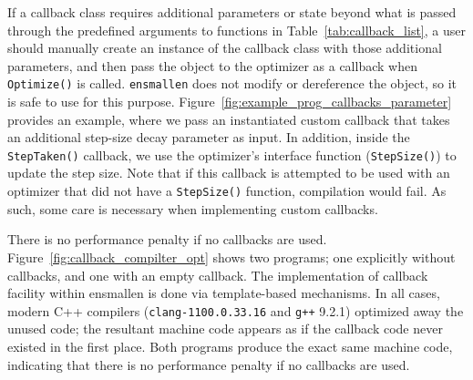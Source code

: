 If a callback class requires additional parameters or state beyond what is
passed through the predefined arguments to functions in
Table~\ref{tab:callback_list}, a user should manually create an instance of the
callback class with those additional parameters, and then pass the object to the
optimizer as a callback when {\tt Optimize()} is called.  {\tt ensmallen} does
not modify or dereference the object, so it is safe to use for this purpose.
Figure~\ref{fig:example_prog_callbacks_parameter} provides an example,
where we pass an instantiated custom callback that takes an additional
step-size decay parameter as input.
In addition, inside the {\tt StepTaken()} callback, we use the
optimizer's interface function ({\tt StepSize()}) to update the step size.
Note that  if this callback is attempted to be used with an optimizer that
did not have a {\tt StepSize()} function, compilation would fail.
As such, some care is necessary when implementing custom callbacks.

There is no performance penalty if no callbacks are used.
Figure~\ref{fig:callback_compilter_opt} shows two programs;
one explicitly without callbacks, and one with an empty callback.
The implementation of callback facility within ensmallen is done via
template-based mechanisms.
In all cases, modern C++ compilers ({\tt clang-1100.0.33.16} and {\tt g++} 9.2.1)
optimized away the unused code;
the resultant machine code appears as if the callback code never existed
in the first place.
Both programs produce the exact same machine code,
indicating that there is no performance penalty if no callbacks are used.

